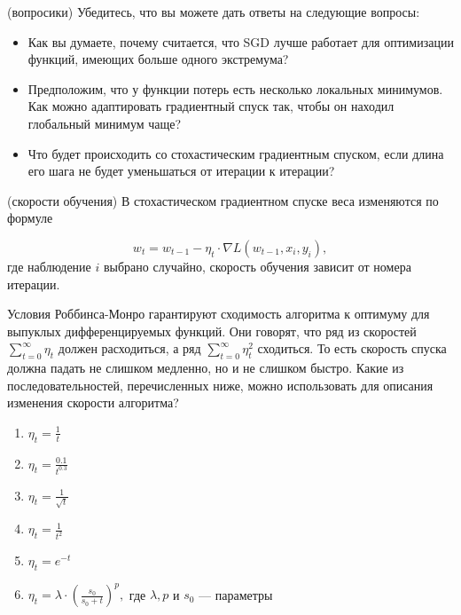 \begin{problem}{(вопросики)}
Убедитесь, что вы можете дать ответы на следующие вопросы: 

\begin{itemize} 
    \item  Как вы думаете, почему считается, что SGD лучше работает для оптимизации функций, имеющих больше одного экстремума?
    
    \item  Предположим, что у функции потерь есть несколько локальных минимумов. Как можно адаптировать градиентный спуск так, чтобы он находил глобальный минимум чаще?
    
    \item Что будет происходить со стохастическим градиентным спуском, если длина его шага не будет уменьшаться от итерации к итерации? 
\end{itemize} 
\end{problem} 


\begin{problem}{(скорости обучения)}
    В стохастическом градиентном спуске веса изменяются по формуле
    
    \[
    w_t = w_{t-1} - \eta_t \cdot \nabla L(w_{t-1}, x_i, y_i),
    \] где наблюдение $i$ выбрано случайно, скорость обучения зависит от номера итерации. 
    
    Условия Роббинса-Монро гарантируют сходимость алгоритма к оптимуму для выпуклых дифференцируемых функций. Они говорят, что ряд из скоростей $\sum_{t=0}^{\infty} \eta_t$ должен расходиться, а ряд $\sum_{t=0}^{\infty} \eta_t^2$ сходиться. То есть скорость спуска должна падать не слишком медленно, но и не слишком быстро. Какие из последовательностей, перечисленных ниже, можно использовать для описания изменения скорости алгоритма? 
    
    \begin{enumerate} 
        \item $\eta_t = \frac{1}{t}$ %
        \item $\eta_t = \frac{0.1}{t^{0.3}}$
        \item $\eta_t = \frac{1}{\sqrt{t}}$
        \item $\eta_t = \frac{1}{t^2}$
        \item $\eta_t = e^{-t}$
        \item $\eta_t = \lambda \cdot \left(\frac{s_0}{s_0 + t} \right)^p,$ где $\lambda, p$ и $s_0$ --- параметры
    \end{enumerate} 
\end{problem} 



